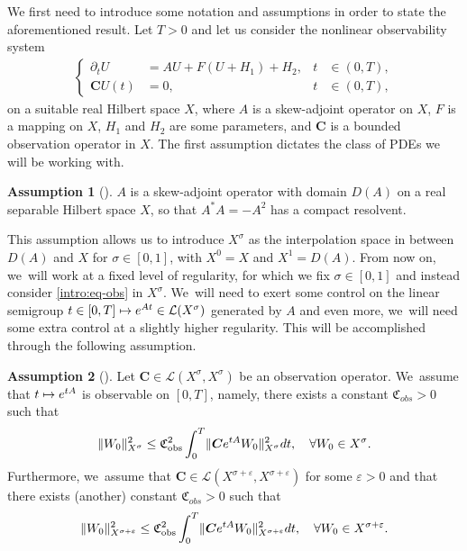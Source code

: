 \documentclass[10pt]{amsart}
\newcommand\mto{\mathchoice{\longmapsto}{\mapsto}{\mapsto}{\mapsto}}
\theoremstyle{definition}
\newtheorem{assum}{Assumption}
\newenvironment{assump}[2][]
{\renewcommand\theassum{#2}\begin{assum}[#1]}
{\end{assum}}
\let\mc\mathcal
\let\veps\varepsilon
\newcommand{\bC}{\boldsymbol{C}}
\providecommand{\norm}[1]{\lVert#1\rVert}
\begin{document}
We first need to introduce some notation and assumptions in order to state the aforementioned result. Let $T>0$ and let us consider the nonlinear observability system
\begin{align}\label{intro:eq-obs}
\left\{\begin{aligned}
\partial_t U&=AU+F(U+H_1)+H_2, &t&\in (0, T), \\
\bC U(t)&=0, &t&\in (0, T),
\end{aligned}\right.
\end{align}
on a suitable real Hilbert space $X$, where $A$ is a skew-adjoint operator on $X$, $F$ is a mapping on $X$, $H_1$ and $H_2$ are some parameters, and $\bC$ is a bounded observation operator in $X$. The first assumption dictates the class of PDEs we will be working with.
\begin{assump}{1}
\label{assumAA}$A$ is a skew-adjoint operator with domain $D(A)$ on a real separable Hilbert space $X$, so that $A^*A=-A^2$ has a compact resolvent.
\end{assump}
This assumption allows us to introduce $X^\sigma$ as the interpolation space in between $D(A)$ and $X$ for $\sigma\in [0, 1]$, with $X^0=X$ and $X^1=D(A)$. From now on, we~will work at a fixed level of regularity, for which we fix $\sigma\in [0, 1]$ and instead consider \eqref{intro:eq-obs} in $X^\sigma$. We~will need to exert some control on the linear semigroup $t\in [0, T]\mto e^{At}\in \mc{L}(X^\sigma)$ generated by $A$ and even more, we~will need some extra control at a slightly higher regularity. This will be accomplished through the following assumption.

\begin{assump}{2}
\label{assumCC}Let $\bC\in\mc{L}(X^\sigma, X^\sigma)$ be an observation operator. We~assume that $t\mto e^{tA}$ is observable on $[0,T]$, namely, there exists a constant $\mathfrak{C}_{obs}>0$ such that
\begin{align}\label{observabstractintro}
\norm{W_0}_{X^\sigma}^2\leq \mathfrak{C}_{\textup{obs}}^2\int_0^T \norm{\bC e^{tA}W_0}_{X^\sigma}^2dt,\quad \forall W_0\in X^\sigma.
\end{align}
Furthermore, we~assume that $\bC\in\mc{L}(X^{\sigma+\veps}, X^{\sigma+\veps})$ for some $\veps>0$ and that there exists (another) constant $\mathfrak{C}_{obs}>0$ such that
\begin{align}\label{observabstractvepsintro}
\norm{W_0}_{X^{\sigma+\veps}}^2\leq \mathfrak{C}_{\textup{obs}}^2\int_0^T \norm{\bC e^{tA}W_0}_{X^{\sigma+\veps}}^2dt,\quad \forall W_0\in X^{\sigma+\veps}.
\end{align}
\end{assump}
\end{document}
